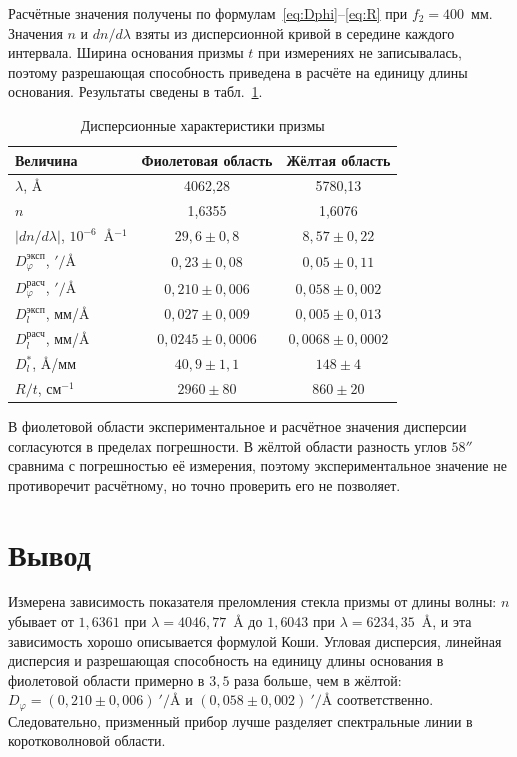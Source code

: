 \documentclass[14pt,a4paper]{extarticle}
\begin{document}
Расчётные значения получены по формулам~\eqref{eq:Dphi}--\eqref{eq:R} при $f_2 = 400$~мм. Значения $n$ и $dn/d\lambda$ взяты из дисперсионной кривой в середине каждого интервала. Ширина основания призмы $t$ при измерениях не записывалась, поэтому разрешающая способность приведена в расчёте на единицу длины основания. Результаты сведены в табл.~\ref{tab:disp}.

\begin{table}[htbp]
\caption{Дисперсионные характеристики призмы}
\label{tab:disp}
\centering
\small
\renewcommand{\arraystretch}{1.3}
\begin{tabular}{lcc}
\toprule
Величина & Фиолетовая область & Жёлтая область \\
\midrule
$\lambda$, \AA & 4062,28 & 5780,13 \\
$n$ & 1,6355 & 1,6076 \\
$|dn/d\lambda|$, $10^{-6}$~\AA$^{-1}$ & $29{,}6 \pm 0{,}8$ & $8{,}57 \pm 0{,}22$ \\
$D_\varphi^{\text{эксп}}$, $'/$\AA & $0{,}23 \pm 0{,}08$ & $0{,}05 \pm 0{,}11$ \\
$D_\varphi^{\text{расч}}$, $'/$\AA & $0{,}210 \pm 0{,}006$ & $0{,}058 \pm 0{,}002$ \\
$D_l^{\text{эксп}}$, мм/\AA & $0{,}027 \pm 0{,}009$ & $0{,}005 \pm 0{,}013$ \\
$D_l^{\text{расч}}$, мм/\AA & $0{,}0245 \pm 0{,}0006$ & $0{,}0068 \pm 0{,}0002$ \\
$D_l^{*}$, \AA/мм & $40{,}9 \pm 1{,}1$ & $148 \pm 4$ \\
$R/t$, см$^{-1}$ & $2960 \pm 80$ & $860 \pm 20$ \\
\bottomrule
\end{tabular}
\end{table}

В фиолетовой области экспериментальное и расчётное значения дисперсии согласуются в пределах погрешности. В жёлтой области разность углов $58''$ сравнима с погрешностью её измерения, поэтому экспериментальное значение не противоречит расчётному, но точно проверить его не позволяет.

\section*{Вывод}

Измерена зависимость показателя преломления стекла призмы от длины волны: $n$ убывает от $1{,}6361$ при $\lambda = 4046{,}77$~\AA{} до $1{,}6043$ при $\lambda = 6234{,}35$~\AA, и эта зависимость хорошо описывается формулой Коши. Угловая дисперсия, линейная дисперсия и разрешающая способность на единицу длины основания в фиолетовой области примерно в $3{,}5$ раза больше, чем в жёлтой: $D_\varphi = (0{,}210 \pm 0{,}006)~'/$\AA{} и $(0{,}058 \pm 0{,}002)~'/$\AA{} соответственно. Следовательно, призменный прибор лучше разделяет спектральные линии в коротковолновой области.
\end{document}
